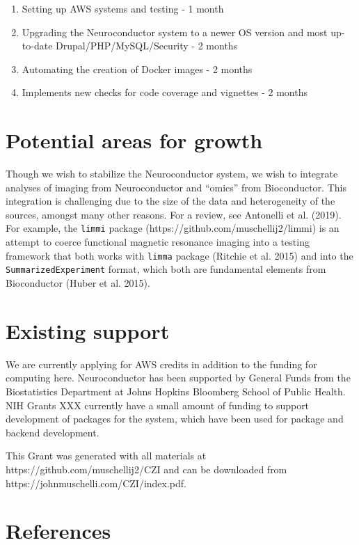 \documentclass[]{elsarticle} %
\providecommand{\tightlist}{%
  \setlength{\itemsep}{0pt}\setlength{\parskip}{0pt}}
\begin{document}
\begin{enumerate}
\def\labelenumi{\arabic{enumi}.}
\tightlist
\item
  Setting up AWS systems and testing - 1 month
\item
  Upgrading the Neuroconductor system to a newer OS version and most
  up-to-date Drupal/PHP/MySQL/Security - 2 months
\item
  Automating the creation of Docker images - 2 months
\item
  Implements new checks for code coverage and vignettes - 2 months
\end{enumerate}

\section{Potential areas for growth}\label{potential-areas-for-growth}

Though we wish to stabilize the Neuroconductor system, we wish to
integrate analyses of imaging from Neuroconductor and ``omics'' from
Bioconductor. This integration is challenging due to the size of the
data and heterogeneity of the sources, amongst many other reasons. For a
review, see Antonelli et al. (2019). For example, the \texttt{limmi}
package (https://github.com/muschellij2/limmi) is an attempt to coerce
functional magnetic resonance imaging into a testing framework that both
works with \texttt{limma} package (Ritchie et al. 2015) and into the
\texttt{SummarizedExperiment} format, which both are fundamental
elements from Bioconductor (Huber et al. 2015).

\section{Existing support}\label{existing-support}

We are currently applying for AWS credits in addition to the funding for
computing here. Neuroconductor has been supported by General Funds from
the Biostatistics Department at Johns Hopkins Bloomberg School of Public
Health. NIH Grants XXX currently have a small amount of funding to
support development of packages for the system, which have been used for
package and backend development.

This Grant was generated with all materials at
https://github.com/muschellij2/CZI and can be downloaded from
https://johnmuschelli.com/CZI/index.pdf.

\section*{References}\label{references}
\end{document}
